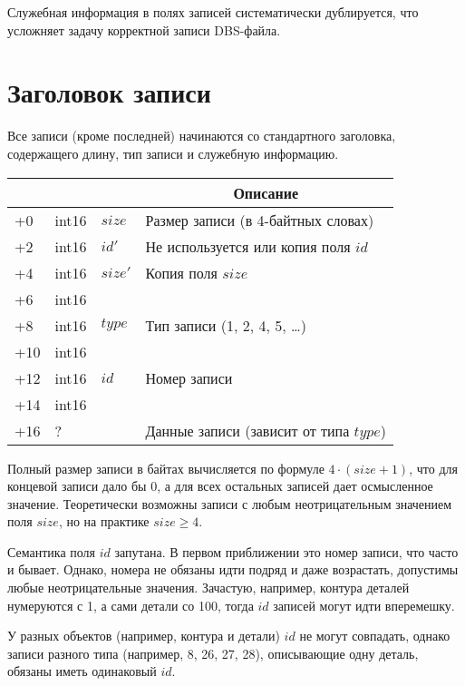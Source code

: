 Служебная информация в полях записей систематически дублируется,
что усложняет задачу корректной записи DBS-файла.

\section*{Заголовок записи}

Все записи
(кроме последней)
начинаются со стандартного заголовка,
содержащего длину, тип записи
и служебную информацию.

\newcommand{\dbsRecord}[1]{
  \noindent
  \begin{tabularx}{\textwidth}{|>{\raggedleft}p{3em}|>{\centering}p{4em}|>{\centering}p{5em}|X|}
    \hline
    \multicolumn{1}{|c|}{Смещение} &
    \multicolumn{1}{c|}{Тип}      &
    \multicolumn{1}{c|}{Имя}      &
    \multicolumn{1}{c|}{Описание}     \\
    \hline
    #1
    \hline
  \end{tabularx}
}

\dbsRecord{
  +0  & int16 & $size$ & Размер записи (в 4-байтных словах) \\
  +2  & int16 & $id'$ & Не используется или копия поля $id$ \\
  +4  & int16 & $size'$ & Копия поля $size$ \\
  +6  & int16 &  &  \\
  +8  & int16 & $type$ & Тип записи (1, 2, 4, 5, \dots) \\
  +10 & int16 &  &  \\
  +12 & int16 & $id$ & Номер записи \\
  +14 & int16 &  &  \\
  +16 & ?     &  & Данные записи (зависит от типа $type$)  \\
}

Полный размер записи в байтах вычисляется по формуле
$4 \cdot (size+1)$,
что для концевой записи дало бы 0,
а для всех остальных записей дает осмысленное значение.
Теоретически возможны записи с любым неотрицательным значением поля
$size$,
но на практике
$size \geqslant 4$.

Семантика поля $id$ запутана.
В первом приближении это номер записи, что часто и бывает.
Однако, номера не обязаны идти подряд и даже возрастать,
допустимы любые неотрицательные значения.
Зачастую, например, контура деталей нумеруются с 1,
а сами детали со 100,
тогда $id$ записей могут идти вперемешку.

У разных объектов
(например, контура и детали)
$id$
не могут совпадать,
однако записи разного типа
(например, 8, 26, 27, 28),
описывающие одну деталь,
обязаны иметь одинаковый
$id$.

